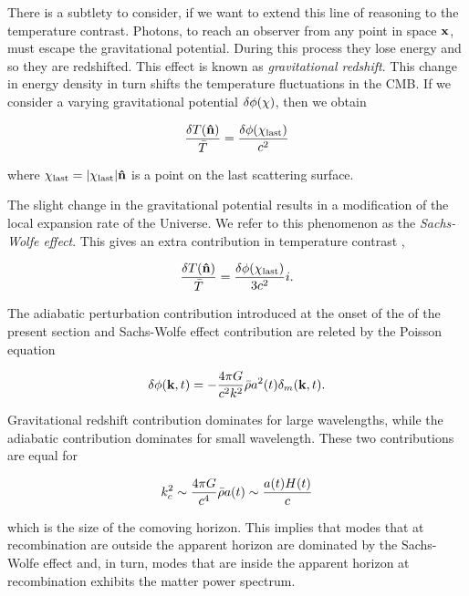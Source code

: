 There is a subtlety to consider, if we want to extend this line of reasoning
to the temperature contrast. Photons, to reach an observer from any point
in space $\vb{x}$, must escape the gravitational potential. During this
process they lose energy and so they are redshifted. This effect is known
as \emph{gravitational redshift}. This change in energy density in turn
shifts the temperature fluctuations in the CMB. If we consider a varying
gravitational potential $\delta \phi\qty(\vb{\chi})$, then we obtain

\begin{equation}
        \frac{\var{T\qty(\vu{n})}}{\bar T} =
        \frac{\var{\phi\qty(\vb{\chi}_\text{last})}}{c^2}
\end{equation}

where $\vb{\chi}_\text{last} = \abs{\vb{\chi}_\text{last}} \vu{n}$ is a
point on the last scattering surface.

The slight change in the gravitational potential results in a modification
of the local expansion rate of the Universe. We refer to this phenomenon as
the \emph{Sachs-Wolfe effect}. This gives an extra contribution in
temperature contrast \autocite{white1996sachs},

\begin{equation}
        \frac{\var{T\qty(\vu{n})}}{\bar T} =
        \frac{\var{\phi\qty(\vb{\chi}_\text{last})}}{3c^2}i.
\end{equation}

The adiabatic perturbation contribution introduced at the onset of the of
the present section and Sachs-Wolfe effect contribution are releted by the
Poisson equation

\begin{equation}
        \var{\phi\qty(\vb{k},t)} = -\frac{4\pi G}{c^2 k^2}
        \bar \rho a^2\qty(t) \delta_m\qty(\vb{k},t).
\end{equation}

Gravitational redshift contribution dominates for large wavelengths, while
the adiabatic contribution dominates for small wavelength. These two
contributions are equal for

\begin{equation}
        k^2_c \sim \frac{4\pi G}{c^4}\bar \rho a\qty(t) \sim
        \frac{a\qty(t)H\qty(t)}{c}
\end{equation}

which is the size of the comoving horizon. This implies that modes that at
recombination are outside the apparent horizon are dominated by the
Sachs-Wolfe effect and, in turn, modes that are inside the apparent horizon
at recombination exhibits the matter power spectrum.

